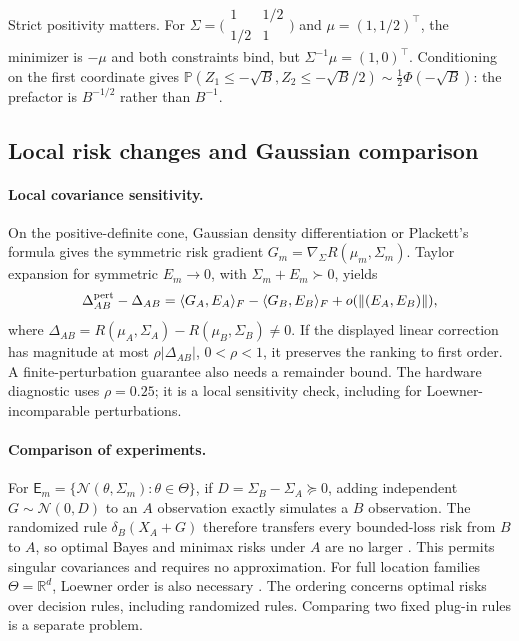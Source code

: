 \documentclass[a4paper,onecolumn,unpublished,nopdfoutputerror]{quantumarticle}
\theoremstyle{plain}
\theoremstyle{definition}
\newcommand{\Prob}{\mathbb{P}}
\newcommand{\calN}{\mathcal{N}}
\newcommand{\R}{\mathbb{R}}
\newcommand{\1}{\mathbf{1}}
\begin{document}
Strict positivity matters. For $\Sigma=\bigl(\begin{smallmatrix}1&1/2\\1/2&1\end{smallmatrix}\bigr)$ and $\mu=(1,1/2)^\top$, the minimizer is $-\mu$ and both constraints bind, but $\Sigma^{-1}\mu=(1,0)^\top$. Conditioning on the first coordinate gives $\Prob(Z_1\le-\sqrt B,Z_2\le-\sqrt B/2)\sim\tfrac12\Phi(-\sqrt B)$: the prefactor is $B^{-1/2}$ rather than $B^{-1}$.

\subsection{Local risk changes and Gaussian comparison}
\label{app:gaussian_comparison}\label{app:slepian_safe}

\paragraph{Local covariance sensitivity.}
On the positive-definite cone, Gaussian density differentiation or Plackett's formula \cite{Plackett1954} gives the symmetric risk gradient $G_m=\nabla_\Sigma R(\mu_m,\Sigma_m)$. Taylor expansion for symmetric $E_m\to0$, with $\Sigma_m+E_m\succ0$, yields
\begin{equation}\label{eq:local_risk_change}
\Delta_{AB}^{\rm pert}-\Delta_{AB}
=\langle G_A,E_A\rangle_F-\langle G_B,E_B\rangle_F
+o(\|(E_A,E_B)\|),
\end{equation}
where $\Delta_{AB}=R(\mu_A,\Sigma_A)-R(\mu_B,\Sigma_B)\ne0$. If the displayed linear correction has magnitude at most $\rho|\Delta_{AB}|$, $0<\rho<1$, it preserves the ranking to first order. A finite-perturbation guarantee also needs a remainder bound. The hardware diagnostic uses $\rho=0.25$; it is a local sensitivity check, including for Loewner-incomparable perturbations.

\paragraph{Comparison of experiments.}
For $\mathsf E_m=\{\calN(\theta,\Sigma_m):\theta\in\Theta\}$, if $D=\Sigma_B-\Sigma_A\succeq0$, adding independent $G\sim\calN(0,D)$ to an $A$ observation exactly simulates a $B$ observation. The randomized rule $\delta_B(X_A+G)$ therefore transfers every bounded-loss risk from $B$ to $A$, so optimal Bayes and minimax risks under $A$ are no larger \cite{Blackwell1953}. This permits singular covariances and requires no approximation. For full location families $\Theta=\R^d$, Loewner order is also necessary \cite{Torgersen1991}. The ordering concerns optimal risks over decision rules, including randomized rules. Comparing two fixed plug-in rules is a separate problem.
\end{document}
